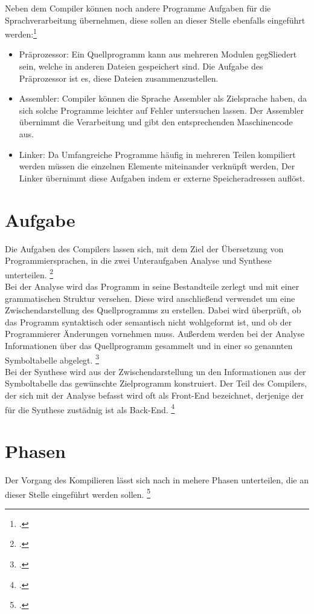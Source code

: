 Neben dem Compiler können noch andere Programme Aufgaben für die Sprachverarbeitung übernehmen, diese sollen an dieser Stelle ebenfalls eingeführt werden:\footcite[Vgl.][S. 4f]{Ullmann2008} \\\begin{itemize}
\setlength\itemsep{-1.5em}
\item Präprozessor: Ein Quellprogramm kann aus mehreren Modulen gegSliedert sein, welche in anderen Dateien gespeichert sind. Die Aufgabe des Präprozessor ist es, diese Dateien zusammenzustellen. 
\item Assembler: Compiler können die Sprache Assembler als Zielsprache haben, da sich solche Programme leichter auf Fehler untersuchen lassen. Der Assembler übernimmt die Verarbeitung und gibt den entsprechenden Maschinencode aus.
\item Linker: Da Umfangreiche Programme häufig in mehreren Teilen kompiliert werden müssen die einzelnen Elemente miteinander verknüpft werden, Der Linker übernimmt diese Aufgaben indem er externe Speicheradressen auflöst.
\end{itemize}
\section{Aufgabe}
Die Aufgaben des Compilers lassen sich, mit dem Ziel der Übersetzung von Programmiersprachen, in die zwei Unteraufgaben Analyse und Synthese unterteilen. \footcite[Vgl.][S. 6]{Ullmann2008}\\
Bei der Analyse wird das Programm in seine Bestandteile zerlegt und mit einer grammatischen Struktur versehen. Diese wird anschließend verwendet um eine Zwischendarstellung des Quellprogramms zu erstellen. Dabei wird überprüft, ob das Programm syntaktisch oder semantisch nicht wohlgeformt ist, und ob der Programmierer Änderungen vornehmen muss. Außerdem werden bei der Analyse Informationen über das Quellprogramm gesammelt und in einer so genannten Symboltabelle abgelegt.  \footcite[Vgl.][S. 6f]{Ullmann2008}\\
Bei der Synthese wird aus der Zwischendarstellung un den Informationen aus der Symboltabelle das gewünschte Zielprogramm konstruiert. Der Teil des Compilers, der sich mit der Analyse befasst wird oft als Front-End bezeichnet, derjenige der für die Synthese zustädnig ist als Back-End.  \footcite[Vgl.][S. 7]{Ullmann2008}
\section{Phasen}
Der Vorgang des Kompilieren lässt sich nach \citeauthor{Ullmann2008} in mehere Phasen unterteilen, die an dieser Stelle eingeführt werden sollen. \footcite[Vgl.][S. 6]{Ullmann2008}
